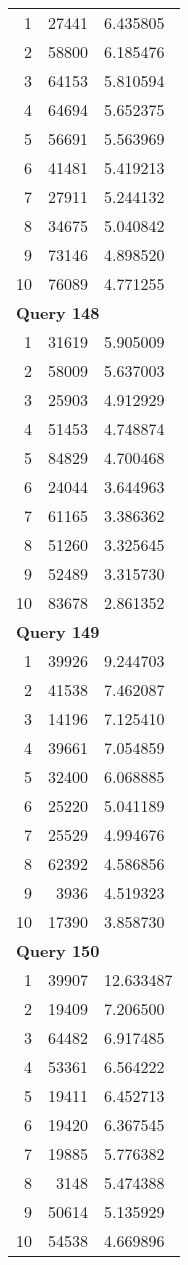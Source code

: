 \begin{longtable}[{p}]{@{}rrp{}@{}}
1 & 27441 & 6.435805 \\
2 & 58800 & 6.185476 \\
3 & 64153 & 5.810594 \\
4 & 64694 & 5.652375 \\
5 & 56691 & 5.563969 \\
6 & 41481 & 5.419213 \\
7 & 27911 & 5.244132 \\
8 & 34675 & 5.040842 \\
9 & 73146 & 4.898520 \\
10 & 76089 & 4.771255 \\
\midrule
\multicolumn{3}{l}{\bfseries Query 148} \\
1 & 31619 & 5.905009 \\
2 & 58009 & 5.637003 \\
3 & 25903 & 4.912929 \\
4 & 51453 & 4.748874 \\
5 & 84829 & 4.700468 \\
6 & 24044 & 3.644963 \\
7 & 61165 & 3.386362 \\
8 & 51260 & 3.325645 \\
9 & 52489 & 3.315730 \\
10 & 83678 & 2.861352 \\
\midrule
\multicolumn{3}{l}{\bfseries Query 149} \\
1 & 39926 & 9.244703 \\
2 & 41538 & 7.462087 \\
3 & 14196 & 7.125410 \\
4 & 39661 & 7.054859 \\
5 & 32400 & 6.068885 \\
6 & 25220 & 5.041189 \\
7 & 25529 & 4.994676 \\
8 & 62392 & 4.586856 \\
9 & 3936 & 4.519323 \\
10 & 17390 & 3.858730 \\
\midrule
\multicolumn{3}{l}{\bfseries Query 150} \\
1 & 39907 & 12.633487 \\
2 & 19409 & 7.206500 \\
3 & 64482 & 6.917485 \\
4 & 53361 & 6.564222 \\
5 & 19411 & 6.452713 \\
6 & 19420 & 6.367545 \\
7 & 19885 & 5.776382 \\
8 & 3148 & 5.474388 \\
9 & 50614 & 5.135929 \\
10 & 54538 & 4.669896 \\
\end{longtable}
